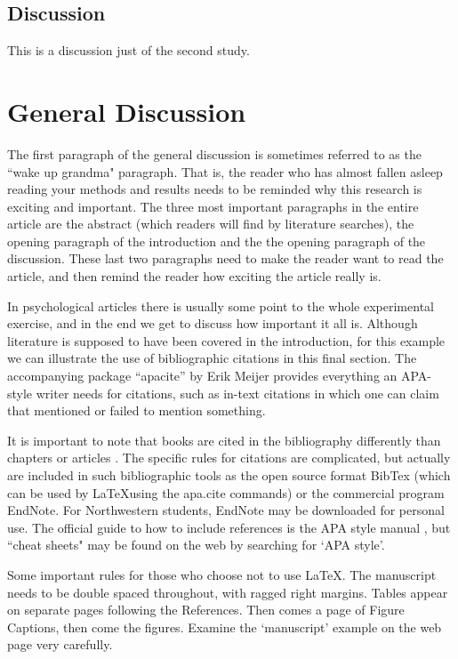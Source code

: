 \documentclass[jou]{apa}%
\begin{document}
\subsection{Discussion} 
This is a discussion just of the second study.  

\section{General Discussion}
The first paragraph of the general discussion is sometimes referred to as the ``wake up grandma" paragraph.  That is, the reader who has almost fallen asleep reading your methods and results needs to be reminded why this research is exciting and important.  The three most important paragraphs in the entire article are the abstract (which readers will find by literature searches), the opening paragraph of the introduction and the the opening paragraph of the discussion.  These last two paragraphs need to make the reader want to read the article, and then remind the reader how exciting the article really is. %

In psychological articles there is usually some point to the whole experimental exercise, and in the end we get to discuss how important it all is.  Although literature is supposed to have been covered in the introduction, for this example we can illustrate the use of bibliographic citations in this final section. The accompanying package ``apacite'' by Erik Meijer provides everything an APA-style writer needs for citations, such as in-text citations in which one can claim that  mentioned or failed to mention something. 

It is important to note that books \cite{leary} are cited in the bibliography differently than chapters \cite{rev:ea07} or articles \cite{killeen}.  The specific rules for citations are complicated, but actually  are included in such bibliographic tools as the open source format BibTex (which can be used by \LaTeX using the  apa.cite commands) or the commercial program EndNote.  For Northwestern students, EndNote may be downloaded for personal use.  The official guide to how to include references is the APA style manual \cite{apa:6}, but ``cheat sheets" may be found on the web by searching for `APA style'. 

Some important rules for those who choose not to use \LaTeX.  The manuscript needs to be double spaced throughout, with ragged right margins.  Tables appear on separate pages following the References.  Then comes a page of Figure Captions, then come the figures.  Examine the `manuscript' example on the web page very carefully.  



\end{document}
